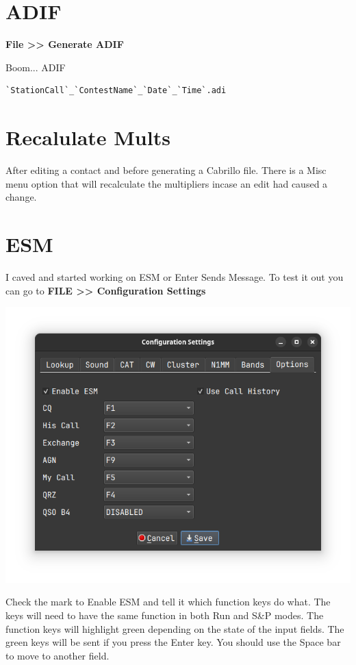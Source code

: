 \documentclass{article}
\begin{document}
\section{ADIF}

\textbf{File >> Generate ADIF}

Boom... ADIF
\begin{verbatim}
`StationCall`_`ContestName`_`Date`_`Time`.adi
\end{verbatim}

\section{Recalulate Mults}

After editing a contact and before generating a Cabrillo file. There is a Misc menu option that will recalculate the multipliers incase an edit had caused a change.
\newpage
\section{ESM}

I caved and started working on ESM or Enter Sends Message. To test it out you can go to \textbf{FILE >> Configuration Settings}

\vspace{0.5cm}
\includegraphics[width=0.9\linewidth]{pic/configuration_options.png}
\vspace{0.5cm}

Check the mark to Enable ESM and tell it which function keys do what. The keys will need to have the same function in both Run and S\&P modes. The function keys will highlight green depending on the state of the input fields. The green keys will be sent if you press the Enter key. You should use the Space bar to move to another field.
\end{document}
